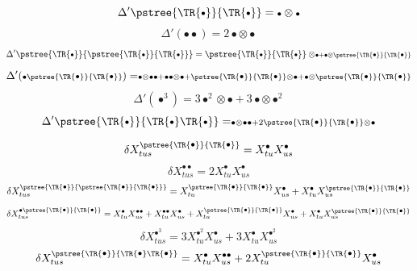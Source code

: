 \documentclass[a4paper]{article}
\newcommand{\1}{{\bf 1}}
\newcommand{\der}{\delta}
\newcommand{\tsnode}{\TR{\raisebox{0.5pt}{\ensuremath{\scriptstyle\bullet}}}}
\newcommand{\tsroot}{\ensuremath{\scriptstyle\bullet}}
\newcommand{\aaabbb}{\pstree{\tsnode}{\pstree{\tsnode}{\tsnode}}}
\newcommand{\aabb}{\pstree{\tsnode}{\tsnode}}
\newcommand{\aababb}{\pstree{\tsnode}{\tsnode \tsnode}}
\newcommand{\der}{\delta}
\begin{document}
\begin{minipage}{.45\textwidth}
\begin{equation*}
\Delta'{ \aabb } = {\tsroot} \otimes { \tsroot }
\end{equation*}
\begin{equation*}
\Delta' ( {\tsroot \tsroot} ) = 2 {\tsroot} \otimes {\tsroot  }
\end{equation*}
\begin{equation*}
\Delta'   \aaabbb = \aabb \otimes \tsroot + \tsroot \otimes \aabb 
\end{equation*}
\begin{equation*}
\Delta' ({ \tsroot \aabb} ) = \tsroot \otimes \tsroot \tsroot + \tsroot \tsroot \otimes \tsroot
+ \aabb \otimes \tsroot + \tsroot \otimes \aabb
\end{equation*}
\begin{equation*}
\Delta'(\tsroot^3) = 3 \tsroot^2 \otimes \tsroot + 3 \tsroot \otimes \tsroot^2  
\end{equation*}
\begin{equation*}
 \Delta' \aababb  = \tsroot \otimes \tsroot \tsroot + 2 \aabb \otimes \tsroot
\end{equation*}
\end{minipage}
\begin{minipage}{.45\textwidth}
\begin{equation*}
\der X_{tus}^{ \aabb } = X_{tu}^{\tsroot} X_{us}^{ \tsroot }
\end{equation*}
\begin{equation*}
\der X_{tus}^{\tsroot \tsroot}  = 2 X_{tu}^{\tsroot} X_{us}^ {\tsroot  }
\end{equation*}
\begin{equation*}
\der X_{tus}^{ \aaabbb } = X_{tu}^{\aabb}X_{us}^{\tsroot} + X_{tu}^{\tsroot} X_{us}^{\aabb} 
\end{equation*}
\begin{equation*}
\der X_{tus}^{ \tsroot \aabb}  = X_{tu}^{\tsroot} X_{us}^{ \tsroot \tsroot} + X_{tu}^{\tsroot \tsroot} X_{us}^{ \tsroot}
+ X_{tu}^{\aabb} X_{us}^{\tsroot} + X_{tu}^{\tsroot}X_{us}^{ \aabb}
\end{equation*}
\begin{equation*}
\der X_{tus}^{\tsroot^3} = 3 X_{tu}^{\tsroot^2} X_{us}^{ \tsroot } + 3 X_{tu}^{\tsroot}X_{us}^{\tsroot^2}  
\end{equation*}
\begin{equation*}
 \der X_{tus}^{\aababb}  = X_{tu}^{\tsroot}X_{us}^{\tsroot \tsroot} + 2 X_{tu}^{\aabb}X_{us}^{ \tsroot}
\end{equation*}
\end{minipage}
\medskip
\end{document}
